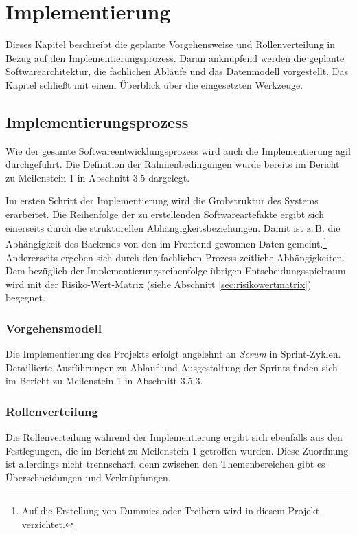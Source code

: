 \documentclass[a4paper,11pt,listof=numbered,glossary=totoc,parskip=half,toc=bib]{scrreprt}
\newcommand{\zB}{\mbox{z.\,B.}\xspace}
\begin{document}
	\newpage
	\chapter{Implementierung}
	Dieses Kapitel beschreibt die geplante Vorgehensweise und Rollenverteilung in Bezug auf den Implementierungsprozess. Daran anknüpfend werden die geplante Softwarearchitektur, die fachlichen Abläufe und das Datenmodell vorgestellt. Das Kapitel schließt mit einem Überblick über die eingesetzten Werkzeuge.
	
	\section{Implementierungsprozess}
	Wie der gesamte Softwareentwicklungsprozess wird auch die Implementierung agil durchgeführt. Die Definition der Rahmenbedingungen wurde bereits im Bericht zu Meilenstein 1 in Abschnitt 3.5 dargelegt.
	
	Im ersten Schritt der Implementierung wird die Grobstruktur des Systems erarbeitet. Die Reihenfolge der zu erstellenden Softwareartefakte ergibt sich einerseits durch die strukturellen Abhängigkeitsbeziehungen. Damit ist \zB die Abhängigkeit des Backends von den im Frontend gewonnen Daten gemeint.\footnote{Auf die Erstellung von Dummies oder Treibern wird in diesem Projekt verzichtet.} Andererseits ergeben sich durch den fachlichen Prozess zeitliche Abhängigkeiten. Dem bezüglich der Implementierungsreihenfolge übrigen Entscheidungsspielraum wird mit der Risiko-Wert-Matrix (siehe Abschnitt \ref{sec:risikowertmatrix}) begegnet.
	
	\subsection{Vorgehensmodell}
	
	Die Implementierung des Projekts erfolgt angelehnt an \textit{Scrum} in Sprint-Zyklen. Detaillierte Ausführungen zu Ablauf und Ausgestaltung der Sprints finden sich im Bericht zu Meilenstein 1 in Abschnitt 3.5.3. 
	
	\subsection{Rollenverteilung}
	Die Rollenverteilung während der Implementierung ergibt sich ebenfalls aus den Festlegungen, die im Bericht zu Meilenstein 1 getroffen wurden. Diese Zuordnung ist allerdings nicht trennscharf, denn zwischen den Themenbereichen gibt es Überschneidungen und Verknüpfungen. 
	
\end{document}
